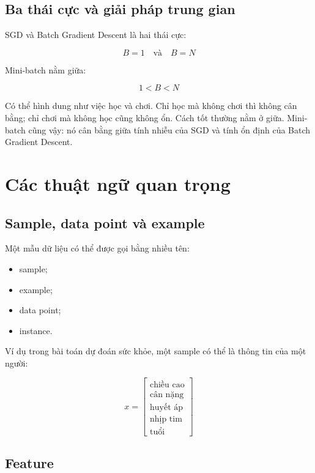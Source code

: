 \documentclass[12pt,a4paper]{report}
\begin{document}
\section{Ba thái cực và giải pháp trung gian}

SGD và Batch Gradient Descent là hai thái cực:

\[
    B=1
    \quad \text{và} \quad
    B=N
\]

Mini-batch nằm giữa:

\[
    1 < B < N
\]

\begin{vidu}
Có thể hình dung như việc học và chơi. Chỉ học mà không chơi thì không cân bằng; chỉ chơi mà không học cũng không ổn. Cách tốt thường nằm ở giữa. Mini-batch cũng vậy: nó cân bằng giữa tính nhiễu của SGD và tính ổn định của Batch Gradient Descent.
\end{vidu}

\chapter{Các thuật ngữ quan trọng}

\section{Sample, data point và example}

Một mẫu dữ liệu có thể được gọi bằng nhiều tên:

\begin{itemize}
    \item sample;
    \item example;
    \item data point;
    \item instance.
\end{itemize}

Ví dụ trong bài toán dự đoán sức khỏe, một sample có thể là thông tin của một người:

\[
    x =
    \begin{bmatrix}
    \text{chiều cao}\\
    \text{cân nặng}\\
    \text{huyết áp}\\
    \text{nhịp tim}\\
    \text{tuổi}
    \end{bmatrix}
\]

\section{Feature}
\end{document}
